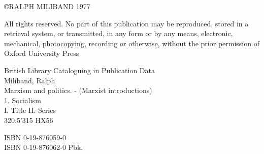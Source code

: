 

\noindent{}\copyright \quad RALPH MILIBAND 1977

\noindent{}All rights reserved. No part of this publication may be reproduced, stored in a retrieval system, or transmitted, in any form or by any means, electronic, mechanical, photocopying, recording or otherwise, without the prior permission of Oxford University Press

\noindent{}British Library Cataloguing in Publication Data\\
Miliband, Ralph\\
Marxism and politics. - (Marxist introductions)\\
1. Socialism\\
I. Title II. Series\\
320.5'315 \space{} HX56

\noindent{}ISBN 0-19-876059-0\\
ISBN 0-19-876062-0 Pbk.

